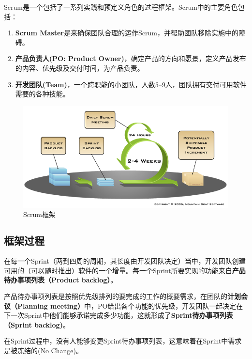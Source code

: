 Scrum是一个包括了一系列实践和预定义角色的过程框架。Scrum中的主要角色包括：

\begin{enumerate}
\item \textbf{Scrum Master}是来确保团队合理的运作Scrum，并帮助团队移除实施中的障碍。

\item \textbf{产品负责人(PO: Product Owner)}，确定产品的方向和愿景，定义产品发布的内容、优先级及交付时间，为产品负责。

\item \textbf{开发团队(Team)}，一个跨职能的小团队，人数5--9人，团队拥有交付可用软件需要的各种技能。

\end{enumerate}

\begin{figure}[htbp]
\centering
\includegraphics[keepaspectratio,width=\textwidth,height=0.75\textheight]{img/18333fig0102-tn.png}
\caption{Scrum框架}
\end{figure}

\subsection{框架过程}
\label{框架过程}

在每一个Sprint（两到四周的周期，其长度由开发团队决定）当中，开发团队创建可用的（可以随时推出）软件的一个增量。每一个Sprint所要实现的功能来自\textbf{产品待办事项列表（Product backlog）}。

产品待办事项列表是按照优先级排列的要完成的工作的概要需求，在团队的\textbf{计划会议（Planning meeting）}中，PO给出各个功能的优先级，开发团队一起决定在下一次Sprint中他们能够承诺完成多少功能，这就形成了\textbf{Sprint待办事项列表（Sprint backlog)}。

在Sprint过程中，没有人能够变更Sprint待办事项列表，这意味着在Sprint中需求是被冻结的(No Change)。

